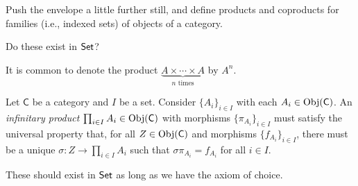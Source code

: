 \begin{problem}[5.10]
	Push the envelope a little further still, and define products and coproducts for families (i.e., indexed sets) of objects of a category.
	
	Do these exist in $\mathsf{Set}$?
	
	It is common to denote the product $\underbrace{A\times\cdots\times A}_{n \text{ times}}$ by $A^n$.
\end{problem}
\begin{solution}
	Let $\mathsf{C}$ be a category and $I$ be a set. Consider $\{A_i\}_{i\in I}$ with each
	$A_i\in\mathrm{Obj}(\mathsf{C})$. An \textit{infinitary product} $\prod_{i\in I}
	A_i\in\mathrm{Obj}(\mathsf{C})$ with morphisms $\{\pi_{A_i}\}_{i\in I}$ must satisfy the
	universal property that, for all $Z\in\mathrm{Obj}(\mathsf{C})$ and morphisms $\{f_{A_i}\}_{i\in
		I}$, there must be a unique $\sigma:Z\to\prod_{i\in I}A_i$ such that
	$\sigma\pi_{A_i}=f_{A_i}$ for all $i\in I$.
	
	These should exist in $\mathsf{Set}$ as long as we have the axiom of choice.
\end{solution}


